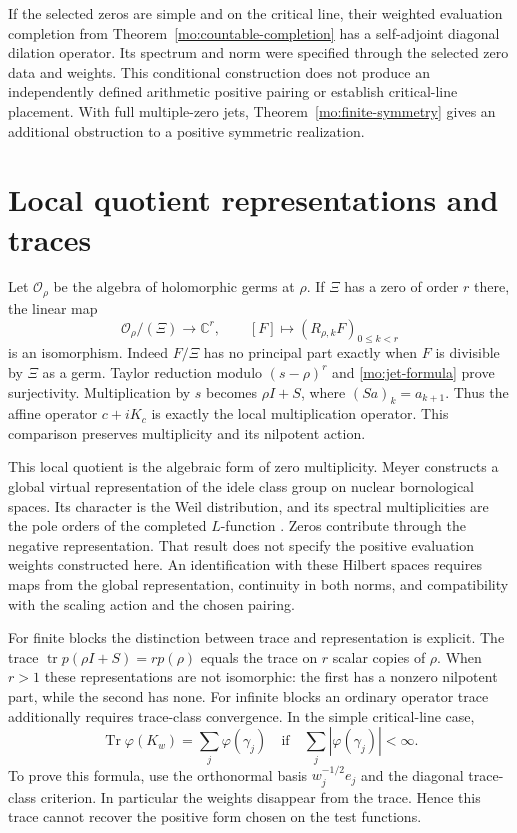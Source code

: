 If the selected zeros are simple and on the critical line, their
weighted evaluation completion from
Theorem~\ref{mo:countable-completion} has a self-adjoint diagonal dilation
operator. Its spectrum and norm were specified through the selected
zero data and weights. This conditional construction does not
produce an independently defined arithmetic positive pairing or
establish critical-line placement. With full multiple-zero jets,
Theorem~\ref{mo:finite-symmetry} gives an additional obstruction to a
positive symmetric realization.

\section{Local quotient representations and traces}

Let $\mathcal O_\rho$ be the algebra of holomorphic germs at
$\rho$. If $\Xi$ has a zero of order $r$ there, the linear map
\[
 \mathcal O_\rho/(\Xi)\longrightarrow\mathbb C^r,
 \qquad [F]\longmapsto(R_{\rho,k}F)_{0\leq k<r}
\]
is an isomorphism. Indeed $F/\Xi$ has no principal part exactly
when $F$ is divisible by $\Xi$ as a germ. Taylor reduction modulo
$(s-\rho)^r$ and \eqref{mo:jet-formula} prove surjectivity.
Multiplication by $s$ becomes $\rho I+S$, where
$(Sa)_k=a_{k+1}$. Thus the affine operator $c+iK_c$ is exactly
the local multiplication operator. This comparison preserves
multiplicity and its nilpotent action.

This local quotient is the algebraic form of zero multiplicity.
Meyer constructs a global virtual representation of the idele
class group on nuclear bornological spaces. Its character is
the Weil distribution, and its spectral multiplicities are the
pole orders of the completed $L$-function
\cite[Theorems~5.8 and~5.11, pp.~43 and~47]{Meyer}.
Zeros contribute through the negative representation. That result
does not specify the positive evaluation weights constructed here.
An identification with these Hilbert spaces requires maps from
the global representation, continuity in both norms, and compatibility
with the scaling action and the chosen pairing.

For finite blocks the distinction between trace and representation
is explicit. The trace $\operatorname{tr}p(\rho I+S)=rp(\rho)$
equals the trace on $r$ scalar copies of $\rho$.
When $r>1$ these representations are not isomorphic: the first has
a nonzero nilpotent part, while the second has none.
For infinite blocks an ordinary operator trace additionally requires
trace-class convergence. In the simple critical-line case,
\[
 \operatorname{Tr}\varphi(K_w)=\sum_j\varphi(\gamma_j)
 \quad\text{if}\quad \sum_j|\varphi(\gamma_j)|<\infty.
\]
To prove this formula, use the orthonormal basis
$w_j^{-1/2}e_j$ and the diagonal trace-class criterion.
In particular the weights disappear from the trace.
Hence this trace cannot recover the positive form chosen on
the test functions.

